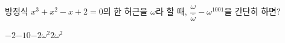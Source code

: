 방정식 $x^3+x^2-x+2=0$의 한 허근을 $\omega$라 할 때, $\dfrac{\omega}{\bar{\omega}}-\omega^{1001}$을 간단히 하면? 
\begin{choices32}{$-2$}{$-1$}{$0$}{$-2\omega^2$}{$2\omega^2$}\end{choices32}
